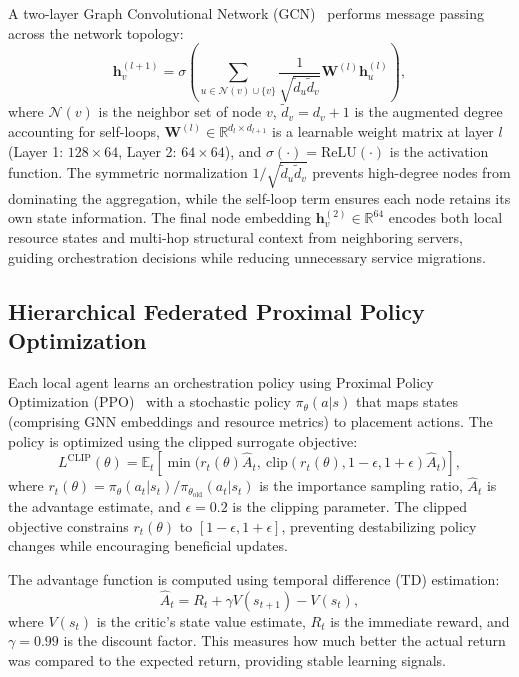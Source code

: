 A two-layer Graph Convolutional Network (GCN)~\cite{Kipf2017_GCN} performs message passing across the network topology:
\begin{equation}
	\mathbf{h}_v^{(l+1)} = \sigma\!\left(\sum_{u \in \mathcal{N}(v) \cup \{v\}} \frac{1}{\sqrt{\tilde{d}_u \tilde{d}_v}} \mathbf{W}^{(l)} \mathbf{h}_u^{(l)}\right),
\end{equation}
where $\mathcal{N}(v)$ is the neighbor set of node $v$, $\tilde{d}_v = d_v + 1$ is the augmented degree accounting for self-loops, $\mathbf{W}^{(l)} \in \mathbb{R}^{d_l \times d_{l+1}}$ is a learnable weight matrix at layer $l$ (Layer 1: $128 \times 64$, Layer 2: $64 \times 64$), and $\sigma(\cdot) = \text{ReLU}(\cdot)$ is the activation function. The symmetric normalization $1/\sqrt{\tilde{d}_u \tilde{d}_v}$ prevents high-degree nodes from dominating the aggregation, while the self-loop term ensures each node retains its own state information. The final node embedding $\mathbf{h}_v^{(2)} \in \mathbb{R}^{64}$ encodes both local resource states and multi-hop structural context from neighboring servers, guiding orchestration decisions while reducing unnecessary service migrations.

\subsection{Hierarchical Federated Proximal Policy Optimization}
Each local agent learns an orchestration policy using Proximal Policy Optimization (PPO)~\cite{Schulman2017_PPO} with a stochastic policy $\pi_{\theta}(a|s)$ that maps states (comprising GNN embeddings and resource metrics) to placement actions. The policy is optimized using the clipped surrogate objective:
\begin{equation}
	L^{\text{CLIP}}(\theta) = \mathbb{E}_t\!\left[\min\!\big(r_t(\theta)\hat{A}_t, \ \text{clip}(r_t(\theta), 1-\epsilon, 1+\epsilon)\hat{A}_t\big)\right],
\end{equation}
where $r_t(\theta) = \pi_\theta(a_t|s_t)/\pi_{\theta_{\text{old}}}(a_t|s_t)$ is the importance sampling ratio, $\hat{A}_t$ is the advantage estimate, and $\epsilon = 0.2$ is the clipping parameter. The clipped objective constrains $r_t(\theta)$ to $[1-\epsilon, 1+\epsilon]$, preventing destabilizing policy changes while encouraging beneficial updates.

The advantage function is computed using temporal difference (TD) estimation:
\begin{equation}
	\hat{A}_t = R_t + \gamma V(s_{t+1}) - V(s_t),
\end{equation}
where $V(s_t)$ is the critic's state value estimate, $R_t$ is the immediate reward, and $\gamma = 0.99$ is the discount factor. This measures how much better the actual return was compared to the expected return, providing stable learning signals.

